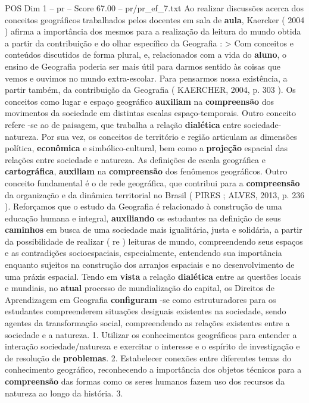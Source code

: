 \begin{textsample}{POS Dim 1 – pr – Score 67.00 – pr/pr\_ef\_7.txt}
Ao realizar discussões acerca dos conceitos geográficos trabalhados pelos docentes em sala de \textbf{aula}, Kaercker ( 2004 ) afirma a importância dos mesmos para a realização da leitura do mundo obtida a partir da contribuição e do olhar específico da Geografia : > Com conceitos e conteúdos discutidos de forma plural, e, relacionados com a vida do \textbf{aluno}, o ensino de Geografia poderia ser mais útil para darmos sentido às coisas que vemos e ouvimos no mundo extra-escolar.
Para pensarmos nossa existência, a partir também, da contribuição da Geografia ( KAERCHER, 2004, p. 303 ).
Os conceitos como lugar e espaço geográfico \textbf{auxiliam} na \textbf{compreensão} dos movimentos da sociedade em distintas escalas espaço-temporais.
Outro conceito refere -se ao de paisagem, que trabalha a relação \textbf{dialética} entre sociedade-natureza.
Por sua vez, os conceitos de território e região articulam as dimensões política, \textbf{econômica} e simbólico-cultural, bem como a \textbf{projeção} espacial das relações entre sociedade e natureza.
As definições de escala geográfica e \textbf{cartográfica}, \textbf{auxiliam} na \textbf{compreensão} dos fenômenos geográficos.
Outro conceito fundamental é o de rede geográfica, que contribui para a \textbf{compreensão} da organização e da dinâmica territorial no Brasil ( PIRES ; ALVES, 2013, p. 236 ).
Reforçamos que o estudo da Geografia é relacionado à construção de uma educação humana e integral, \textbf{auxiliando} os estudantes na definição de seus \textbf{caminhos} em busca de uma sociedade mais igualitária, justa e solidária, a partir da possibilidade de realizar ( re ) leituras de mundo, compreendendo seus espaços e as contradições socioespaciais, especialmente, entendendo sua importância enquanto sujeitos na construção dos arranjos espaciais e no desenvolvimento de uma práxis espacial.
Tendo em \textbf{vista} a relação \textbf{dialética} entre as questões locais e mundiais, no \textbf{atual} processo de mundialização do capital, os Direitos de Aprendizagem em Geografia \textbf{configuram} -se como estruturadores para os estudantes compreenderem situações desiguais existentes na sociedade, sendo agentes da transformação social, compreendendo as relações existentes entre a sociedade e a natureza. 1.
Utilizar os conhecimentos geográficos para entender a interação sociedade/natureza e exercitar o interesse e o espírito de investigação e de resolução de \textbf{problemas}. 2.
Estabelecer conexões entre diferentes temas do conhecimento geográfico, reconhecendo a importância dos objetos técnicos para a \textbf{compreensão} das formas como os seres humanos fazem uso dos recursos da natureza ao longo da história. 3.

\end{textsample}
